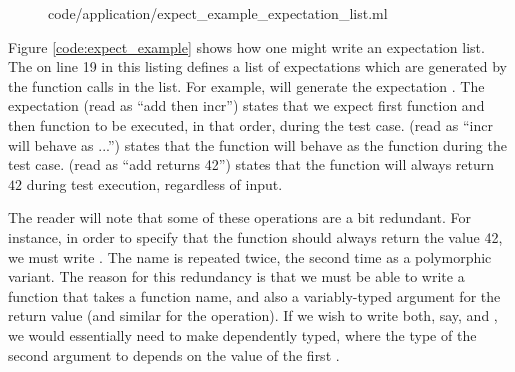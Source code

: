 \begin{figure}
 {code/application/expect_example_expectation_list.ml}
\end{figure}

Figure \ref{code:expect_example} shows how one might write an
expectation list. The  on line 19 in this listing defines
a list of expectations which are generated by the function calls in
the list. For example,  will generate the expectation
. The expectation  (read as ``add
then incr'') states that we expect first function  and then
function  to be executed, in that order, during the test
case.   (read as ``incr will behave
as ...'')  states that the  function will behave as the
function  during the test case.
 (read as ``add returns 42'') states that the
 function will always return $42$ during test execution,
regardless of input.

The reader will note that some of these operations are a bit
redundant. For instance, in order to specify that the 
function should always return the value 42, we must write
. The name  is repeated twice, the
second time as a polymorphic variant. The reason for this redundancy
is that we must be able to write a  function that takes
a function name, and also a variably-typed argument for the return
value (and similar for the  operation). If we wish to write
both, say,  and , we would
essentially need to make \code{*->} dependently typed, where the type
of the second argument to \code{*->} depends on the value of the first
\cite[Chapter 2]{pierce:atapl}.

